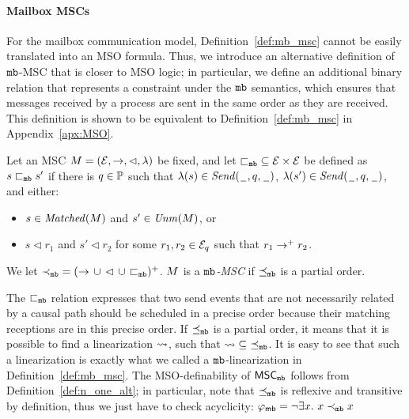 \paragraph{\bf Mailbox MSCs}
For the mailbox communication model, Definition~\ref{def:mb_msc} cannot be easily translated into an MSO formula. Thus, we introduce an alternative definition of $\mathtt{mb}$-MSC that is closer to MSO logic; in particular, we define an additional binary relation that represents a constraint under the $\mathtt{mb}$ semantics, which ensures that messages received by a process are sent in the same order as they are received. This definition is shown to be equivalent to Definition~\ref{def:mb_msc} in Appendix~\ref{apx:MSO}.

\begin{definition} \label{def:n_one_alt}
	Let an MSC $M = (\mathcal{E},\to,\lhd,\lambda)$ be fixed, and let ${\sqsubset_{\mathtt{mb}}} \subseteq \mathcal{E} \times \mathcal{E}$
	be defined as $s \sqsubset_{\mathtt{mb}} s'$ if there is $q \in \mathbb{P}$
	such that $\lambda(s) \in {\mathit{Send}(\hspace{0.1em}\underline{\hspace{0.5em}}\hspace{0.1em},q,\hspace{0.1em}\underline{\hspace{0.5em}}\hspace{0.1em})}$,
	$\lambda(s') \in {\mathit{Send}(\hspace{0.1em}\underline{\hspace{0.5em}}\hspace{0.1em},q,\hspace{0.1em}\underline{\hspace{0.5em}}\hspace{0.1em})}$, and either:
	\begin{itemize}%
		\item $s \in \mathit{Matched}(M)$ and $s' \in \mathit{Unm}(M)$, or
		\item $s \lhd r_1$ and $s' \lhd r_2$ for some $r_1,r_2 \in \mathcal{E}_q$ such that $r_1 \to^+ r_2$.
	\end{itemize}

	We let ${\prec_{\mathtt{mb}}} = ({\to} \,\cup\, {\lhd} \,\cup\, {\sqsubset_{\mathtt{mb}}})^+$.
	$M $ is a \emph{$\mathtt{mb}$-MSC}
	if ${\preceq_{\mathtt{mb}}}$ is a partial order.
\end{definition}
The ${\sqsubset_{\mathtt{mb}}}$ relation expresses that two send events that are not necessarily related by a causal path should be scheduled in a precise order because their matching receptions are in this precise order. If ${\preceq_{\mathtt{mb}}}$ is a partial order, it means that it is possible to find a linearization $\rightsquigarrow$, such that $\rightsquigarrow \;\subseteq\; \preceq_{\mathtt{mb}}$. It is easy to see that such a linearization is exactly what we called a $\mathtt{mb}$-linearization in Definition~\ref{def:mb_msc}.
The MSO-definability of $\mathsf{MSC}_{\mathtt{mb}}$ follows from Definition~\ref{def:n_one_alt}; in particular, note that 
$\preceq_{\mathtt{mb}}$ is reflexive and transitive by definition, 
thus we just have to check acyclicity:
$
	\varphi_{\mathsf{mb}} = \neg \exists x.\ x \prec_{\mathtt{mb}} x 
$
